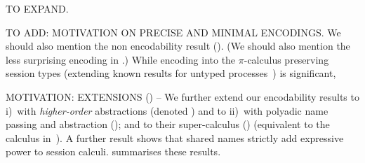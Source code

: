 TO EXPAND.


TO ADD: MOTIVATION ON PRECISE AND MINIMAL ENCODINGS. We should also mention the non encodability result ().
(We should also mention the less surprising encoding in .) 
While encoding \HOp 
into the $\pi$-calculus preserving session types 
(extending  known  results for untyped processes~\cite{SangiorgiD:expmpa}) is 
significant, 


MOTIVATION: EXTENSIONS () -- We further extend our encodability results to 
i)~\HOp with \emph{higher-order} abstractions (denoted \HOpp) 
and to ii)~\HOp with polyadic name passing and abstraction (\pHOp); and to
their super-calculus  (\PHOpp) (equivalent to the calculus in~\cite{tlca07}). 
A further result shows that 
shared names
strictly add expressive power 
to session calculi. 
 summarises %
these results. %

